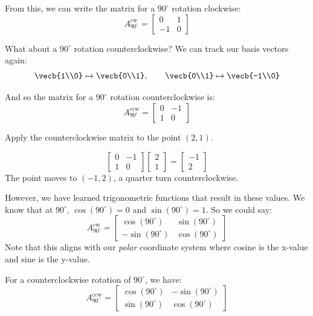 From this, we can write the matrix for a $90^\circ$ rotation clockwise:
\[A_{90^\circ}^{\textrm{cw}} = \begin{bmatrix} 0 & 1 \\ -1 & 0 \end{bmatrix}\]

What about a $90^\circ$ rotation counterclockwise? We can track our basis vectors again:
$$\vecb{1\\0}\mapsto\vecb{0\\1}, \qquad \vecb{0\\1}\mapsto\vecb{-1\\0}$$

And so the matrix for a $90^\circ$ rotation counterclockwise is:
\[A_{90^\circ}^{\textrm{ccw}} = \begin{bmatrix} 0 & -1 \\ 1 & 0 \end{bmatrix}\]

\begin{Worked}
\begin{Problem}
Apply the counterclockwise matrix to the point $(2, 1)$.
\end{Problem}
\begin{Solution}
$$\begin{bmatrix} 0 & -1 \\ 1 & 0 \end{bmatrix}\begin{bmatrix} 2 \\ 1 \end{bmatrix} = \begin{bmatrix} -1 \\ 2 \end{bmatrix}$$
The point moves to $(-1, 2)$, a quarter turn counterclockwise.
\end{Solution}
\end{Worked}

However, we have learned trigonometric functions that result in these values. We know that at $90^\circ$, $\cos(90^\circ) = 0$ and $\sin(90^\circ) = 1$. So we could say:
\[A_{90^\circ}^{\textrm{cw}} = \begin{bmatrix} \cos(90^\circ) & \sin(90^\circ) \\ -\sin(90^\circ) & \cos(90^\circ) \end{bmatrix}\]
Note that this aligns with our \emph{polar} coordinate system where cosine is the x-value and sine is the y-value. 

For a counterclockwise rotation of $90^\circ$, we have:
\[A_{90^\circ}^{\textrm{ccw}} = \begin{bmatrix} \cos(90^\circ) & -\sin(90^\circ) \\ \sin(90^\circ) & \cos(90^\circ) \end{bmatrix}\]

